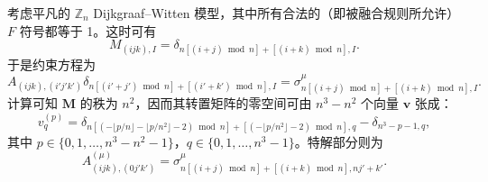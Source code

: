 考虑平凡的 $\mathbb{Z}_n$ Dijkgraaf--Witten 模型，其中所有合法的（即被融合规则所允许）$F$ 符号都等于 1。这时可有
\begin{equation}
  M_{(ijk), I} = \delta_{n[(i+j)\bmod n]+[(i+k)\bmod n], I}.
\end{equation}
于是约束方程为
\begin{equation}
    A_{(ijk), (i'j'k')} \delta_{n[(i'+j')\bmod n]+[(i'+k')\bmod n], I}
  = \sigma^\mu_{n[(i+j)\bmod n]+[(i+k)\bmod n], I}.
\end{equation}
计算可知 $\bm{M}$ 的秩为 $n^2$，因而其转置矩阵的零空间可由 $n^3-n^2$ 个向量 $\bm{v}$ 张成：
\begin{equation}
    v^{(p)}_q
  = \delta_{n [(- \lfloor p/n\rfloor - \lfloor p/n^2 \rfloor - 2) \bmod n] + [(- \lfloor p/n^2 \rfloor - 2) \bmod n], q}
  - \delta_{n^3-p-1, q},
\end{equation}
其中 $p\in\{0,1,\dots,n^3-n^2-1\}$，$q\in\{0,1,\dots,n^3-1\}$。特解部分则为
\begin{equation}
  A^{(\mu)}_{(ijk), (0j'k')} = \sigma^\mu_{n[(i+j)\bmod n]+[(i+k)\bmod n], nj'+k'}.
\end{equation}

